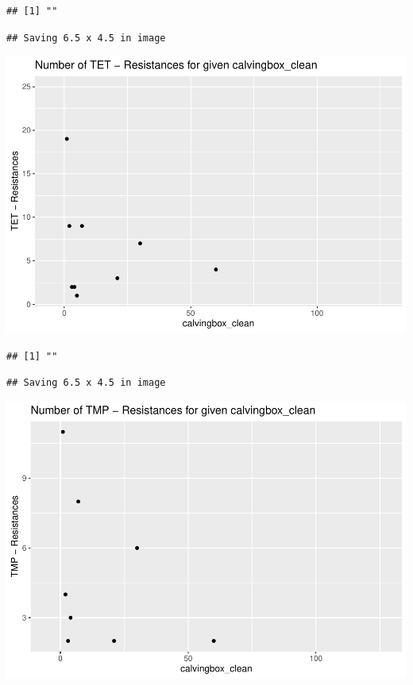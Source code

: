 \documentclass[
]{article}
\begin{document}
\begin{verbatim}
## [1] ""
\end{verbatim}

\begin{verbatim}
## Saving 6.5 x 4.5 in image
\end{verbatim}

\includegraphics{NResistenzen_files/figure-latex/numerical_variables-28.pdf}

\begin{verbatim}
## [1] ""
\end{verbatim}

\begin{verbatim}
## Saving 6.5 x 4.5 in image
\end{verbatim}

\includegraphics{NResistenzen_files/figure-latex/numerical_variables-29.pdf}
\end{document}
